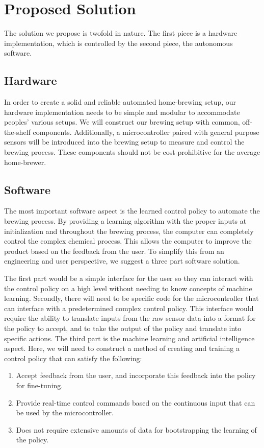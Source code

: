 \documentclass[letterpaper,10pt]{article}
\begin{document}
\section{Proposed Solution}
The solution we propose is twofold in nature.
The first piece is a hardware implementation, which is controlled by the second piece, 
the autonomous software.

\subsection{Hardware}
In order to create a solid and reliable automated home-brewing setup, our hardware 
implementation needs to be simple and modular to accommodate peoples' various setups.
We will construct our brewing setup with common, off-the-shelf components.
Additionally, a microcontroller paired with general purpose sensors will be 
introduced into the brewing setup to measure and control the brewing process.
These components should not be cost prohibitive for the average home-brewer.

\subsection{Software}
The most important software aspect is the learned control policy 
to automate the brewing process. By providing a learning algorithm with the proper 
inputs at initialization and throughout the brewing process, the computer can completely 
control the complex chemical process. This allows the computer to improve the product 
based on the feedback from the user. To simplify this from an engineering and user 
perspective, we suggest a three part software solution.

The first part would be a simple interface for the user so they can 
interact with the control policy on a high level without needing to know concepts of 
machine learning. Secondly, there will need to be specific code for the microcontroller 
that can interface with a predetermined complex control policy. This interface would 
require the ability to translate inputs from the raw sensor data into a format for 
the policy to accept, and to take the  output of the policy and translate into specific 
actions. The third part is the machine learning and artificial intelligence aspect.
Here, we will need to construct a method of creating and training a control policy 
that can satisfy the following:

\begin{enumerate}
	\item Accept feedback from the user, and incorporate this feedback into the 
		policy for fine-tuning.
	\item Provide real-time control commands based on the continuous input that 
		can be used by the microcontroller.
	\item Does not require extensive amounts of data for bootstrapping the learning 
		of the policy.
\end{enumerate}
\end{document}
